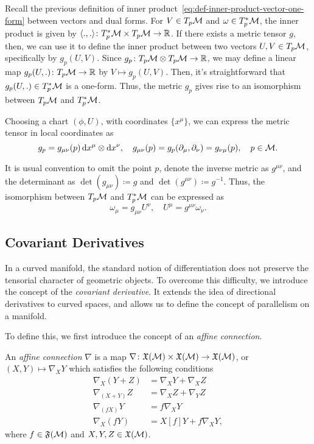 Recall the previous definition of inner product~\eqref{eq:def-inner-product-vector-one-form} between vectors and dual forms. For $V \in T_p \mathcal{M}$ and $\omega \in T^*_p \mathcal{M}$, the inner product is given by $\langle ., . \rangle \colon T^*_p \mathcal{M} \times T_p \mathcal{M} \to \mathbb{R}$. If there exists a metric tensor $g$, then, we can use it to define the inner product between two vectors $U,V \in T_p \mathcal{M}$, specifically by $g_p(U,V)$. Since $g_p \colon T_p \mathcal{M} \otimes T_p \mathcal{M} \to \mathbb{R}$, we may define a linear map $g_p(U,.) \colon T_p \mathcal{M} \to \mathbb{R}$ by $V \mapsto g_p(U,V)$. Then, it's straightforward that $g_p(U,.) \in T^*_p \mathcal{M}$ is a one-form. Thus, the metric $g_p$ gives rise to an isomorphism between $T_p \mathcal{M}$ and $T^*_p \mathcal{M}$.

Choosing a chart $(\phi,U)$, with coordinates $\{ x^\mu \}$, we can express the metric tensor in local coordinates as
\begin{equation}
	g_p = g_{\mu\nu}(p) \mathop{}\!\mathrm{d} x^\mu \otimes \mathop{}\!\mathrm{d} x^\nu, \quad g_{\mu\nu}(p) = g_p (\partial_\mu, \partial_\nu) = g_{\nu\mu}(p), \quad p \in \mathcal{M}.
\end{equation}

It is usual convention to omit the point $p$, denote the inverse metric as $g^{\mu\nu}$, and the determinant as $\det(g_{\mu\nu}) \coloneq g$ and $\det(g^{\mu\nu}) \coloneq g^{-1}$. Thus, the isomorphism between $T_p \mathcal{M}$ and $T^*_p \mathcal{M}$ can be expressed as
\begin{equation}
	\omega_\mu = g_{\mu\nu} U^\nu, \quad U^\mu = g^{\mu\nu} \omega_\nu .
\end{equation}

\subsection{Covariant Derivatives}
In a curved manifold, the standard notion of differentiation does not preserve the tensorial character of geometric objects. To overcome this difficulty, we introduce the concept of the \emph{covariant derivative}. It extends the idea of directional derivatives to curved spaces, and allows us to define the concept of parallelism on a manifold.

To define this, we first introduce the concept of an \emph{affine connection}.
\begin{definition}
    An \emph{affine connection} $\nabla$ is a map $\nabla \colon \mathfrak{X}(\mathcal{M}) \times \mathfrak{X}(\mathcal{M}) \to \mathfrak{X}(\mathcal{M})$, or $(X,Y) \mapsto \nabla_X Y$ which satisfies the following conditions
    \begin{subequations}
        \begin{align}
            \nabla_X (Y + Z) &= \nabla_X Y + \nabla_X Z \\
            \nabla_{(X+Y)} Z &= \nabla_X Z + \nabla_Y Z \\
            \nabla_{(fX)} Y &= f \nabla_X Y \\
            \nabla_X (fY) &= X[f] Y + f \nabla_X Y,
        \end{align}
    \end{subequations}
    where $f \in \mathfrak{F}(\mathcal{M})$ and $X,Y,Z \in \mathfrak{X}(\mathcal{M})$.
\end{definition}

